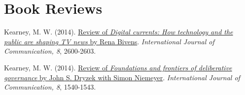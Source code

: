 \section{Book Reviews}
\begin{bibenum}
\item[] Kearney, M. W. (2014).
\href{http://ijoc.org/index.php/ijoc/article/view/3405/1280}{Review of
  \textit{Digital currents: How technology and the public are shaping TV news} by Rena Bivens}.
\textit{International Journal of Communication, 8}, 2600-2603.

\item[] Kearney, M. W. (2014).
\href{http://ijoc.org/index.php/ijoc/article/view/2899/1147}{Review of
  \textit{Foundations and frontiers of deliberative governance} by John S. Dryzek with Simon Niemeyer}.
\textit{International Journal of Communication, 8}, 1540-1543.
\end{bibenum}
